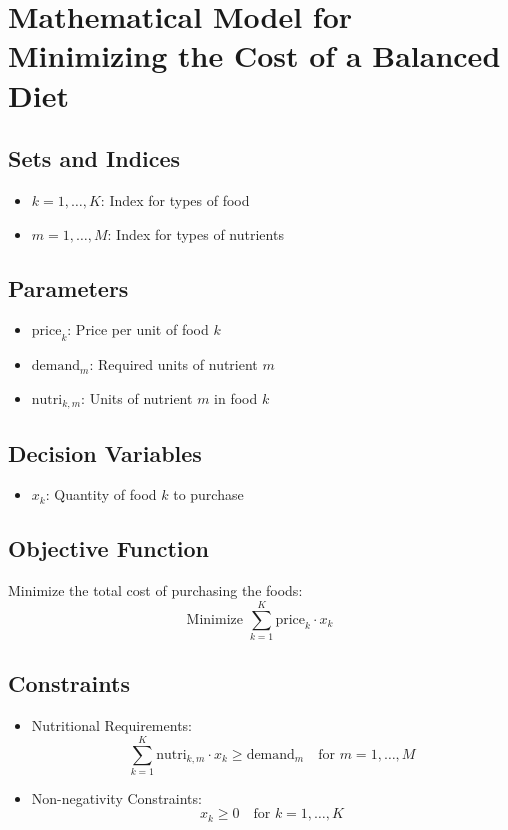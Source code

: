 \documentclass{article}
\begin{document}
\section*{Mathematical Model for Minimizing the Cost of a Balanced Diet}

\subsection*{Sets and Indices}
\begin{itemize}
    \item \( k = 1, \ldots, K \): Index for types of food
    \item \( m = 1, \ldots, M \): Index for types of nutrients
\end{itemize}

\subsection*{Parameters}
\begin{itemize}
    \item \(\text{price}_k\): Price per unit of food \( k \)
    \item \(\text{demand}_m\): Required units of nutrient \( m \)
    \item \(\text{nutri}_{k,m}\): Units of nutrient \( m \) in food \( k \)
\end{itemize}

\subsection*{Decision Variables}
\begin{itemize}
    \item \( x_k \): Quantity of food \( k \) to purchase
\end{itemize}

\subsection*{Objective Function}
Minimize the total cost of purchasing the foods:
\[
\text{Minimize } \sum_{k=1}^{K} \text{price}_k \cdot x_k
\]

\subsection*{Constraints}
\begin{itemize}
    \item Nutritional Requirements:
    \[
    \sum_{k=1}^{K} \text{nutri}_{k, m} \cdot x_k \geq \text{demand}_m \quad \text{for } m = 1, \ldots, M
    \]
    \item Non-negativity Constraints:
    \[
    x_k \geq 0 \quad \text{for } k = 1, \ldots, K
    \]
\end{itemize}
\end{document}
